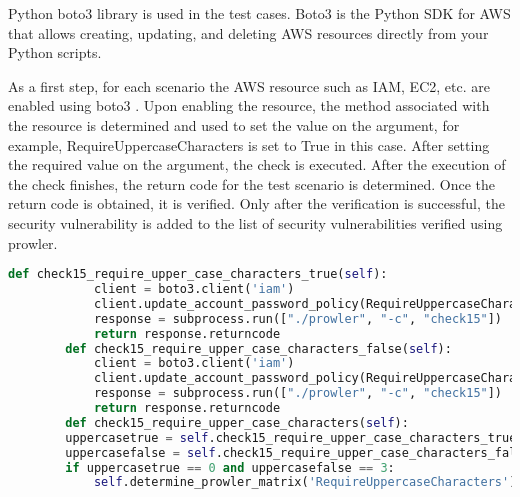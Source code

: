 \par Python boto3 \cite{76} library is used in the test
cases.
Boto3 is the Python SDK for AWS
that allows creating, updating, and deleting AWS resources directly from your Python
scripts.

\par As a first step, for each scenario the AWS resource
such as IAM, EC2, etc. are enabled using boto3 \cite{76}.
Upon enabling the resource, the method associated with the resource is determined and used to set the value on the argument, for example, RequireUppercaseCharacters is set to True in this case. After setting the required value on the argument, the check is executed. After the execution of the check finishes, the return code for the test scenario is determined. Once the return code is obtained, it is verified. Only after the verification is successful, the security vulnerability is added to the list of security vulnerabilities verified using prowler.


\lstset{frame=lines}
\lstset{basicstyle=\footnotesize\ttfamily}

\begin{lstlisting}[language=Python]
	def check15_require_upper_case_characters_true(self):
            client = boto3.client('iam')
            client.update_account_password_policy(RequireUppercaseCharacters=True)
            response = subprocess.run(["./prowler", "-c", "check15"])
            return response.returncode
        def check15_require_upper_case_characters_false(self):
            client = boto3.client('iam')
            client.update_account_password_policy(RequireUppercaseCharacters=False)
            response = subprocess.run(["./prowler", "-c", "check15"])
            return response.returncode
        def check15_require_upper_case_characters(self):
	    uppercasetrue = self.check15_require_upper_case_characters_true()
	    uppercasefalse = self.check15_require_upper_case_characters_false()
	    if uppercasetrue == 0 and uppercasefalse == 3:
	        self.determine_prowler_matrix('RequireUppercaseCharacters')
\end{lstlisting}


